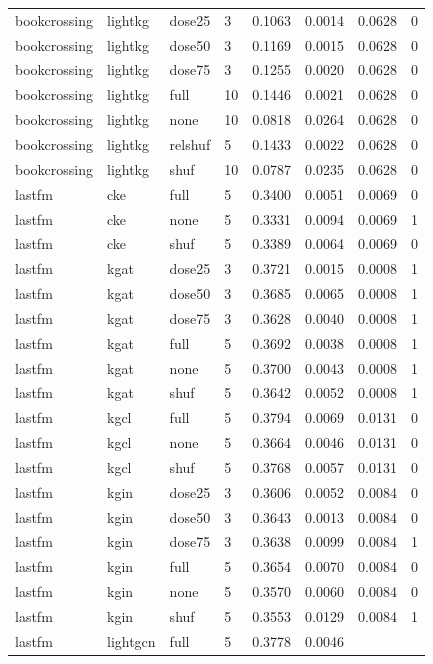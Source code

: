 \begin{table}[t]
\begin{tabular}{llllllll}
bookcrossing & lightkg & dose25 & 3 & 0.1063 & 0.0014 & 0.0628 & 0 \\
bookcrossing & lightkg & dose50 & 3 & 0.1169 & 0.0015 & 0.0628 & 0 \\
bookcrossing & lightkg & dose75 & 3 & 0.1255 & 0.0020 & 0.0628 & 0 \\
bookcrossing & lightkg & full & 10 & 0.1446 & 0.0021 & 0.0628 & 0 \\
bookcrossing & lightkg & none & 10 & 0.0818 & 0.0264 & 0.0628 & 0 \\
bookcrossing & lightkg & relshuf & 5 & 0.1433 & 0.0022 & 0.0628 & 0 \\
bookcrossing & lightkg & shuf & 10 & 0.0787 & 0.0235 & 0.0628 & 0 \\
lastfm & cke & full & 5 & 0.3400 & 0.0051 & 0.0069 & 0 \\
lastfm & cke & none & 5 & 0.3331 & 0.0094 & 0.0069 & 1 \\
lastfm & cke & shuf & 5 & 0.3389 & 0.0064 & 0.0069 & 0 \\
lastfm & kgat & dose25 & 3 & 0.3721 & 0.0015 & 0.0008 & 1 \\
lastfm & kgat & dose50 & 3 & 0.3685 & 0.0065 & 0.0008 & 1 \\
lastfm & kgat & dose75 & 3 & 0.3628 & 0.0040 & 0.0008 & 1 \\
lastfm & kgat & full & 5 & 0.3692 & 0.0038 & 0.0008 & 1 \\
lastfm & kgat & none & 5 & 0.3700 & 0.0043 & 0.0008 & 1 \\
lastfm & kgat & shuf & 5 & 0.3642 & 0.0052 & 0.0008 & 1 \\
lastfm & kgcl & full & 5 & 0.3794 & 0.0069 & 0.0131 & 0 \\
lastfm & kgcl & none & 5 & 0.3664 & 0.0046 & 0.0131 & 0 \\
lastfm & kgcl & shuf & 5 & 0.3768 & 0.0057 & 0.0131 & 0 \\
lastfm & kgin & dose25 & 3 & 0.3606 & 0.0052 & 0.0084 & 0 \\
lastfm & kgin & dose50 & 3 & 0.3643 & 0.0013 & 0.0084 & 0 \\
lastfm & kgin & dose75 & 3 & 0.3638 & 0.0099 & 0.0084 & 1 \\
lastfm & kgin & full & 5 & 0.3654 & 0.0070 & 0.0084 & 0 \\
lastfm & kgin & none & 5 & 0.3570 & 0.0060 & 0.0084 & 0 \\
lastfm & kgin & shuf & 5 & 0.3553 & 0.0129 & 0.0084 & 1 \\
lastfm & lightgcn & full & 5 & 0.3778 & 0.0046 &  &  \\

\end{tabular}
\end{table}
